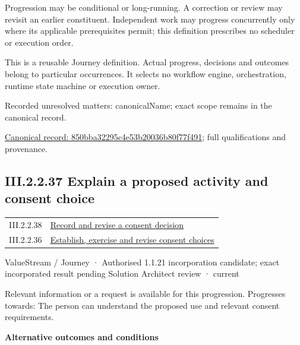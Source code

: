 Progression may be conditional or long-running. A correction or review may revisit an earlier constituent. Independent work may progress concurrently only where its applicable prerequisites permit; this definition prescribes no scheduler or execution order.



This is a reusable Journey definition. Actual progress, decisions and outcomes belong to particular occurrences. It selects no workflow engine, orchestration, runtime state machine or execution owner.


{\small Recorded unresolved matters: canonicalName; exact scope remains in the canonical record.}\par
{\footnotesize \href{../../../../continuum/strategy/value-stream/850bba32295c4e53b20036b80f77f491.md}{Canonical record: 850bba32295c4e53b20036b80f77f491}; full qualifications and provenance.}\par
\subsection*{III.2.2.37 Explain a proposed activity and consent choice}
\label{navigation:III.2.2.37}

\begin{longtable}{p{.22\linewidth}p{.73\linewidth}}
III.2.2.38 & \hyperref[element:74779c85619741d18053a2304457190b]{Record and revise a consent decision} \\
III.2.2.36 & \hyperref[element:850bba32295c4e53b20036b80f77f491]{Establish, exercise and revise consent choices} \\
\end{longtable}
\label{element:ddc83b3ab1e646d5bf86578001959480}
{\small ValueStream / Journey · Authorised 1.1.21 incorporation candidate; exact incorporated result pending Solution Architect review · current}\par

Relevant information or a request is available for this progression. Progresses towards: The person can understand the proposed use and relevant consent requirements.



\par\medskip\textbf{Alternative outcomes and conditions}\par


